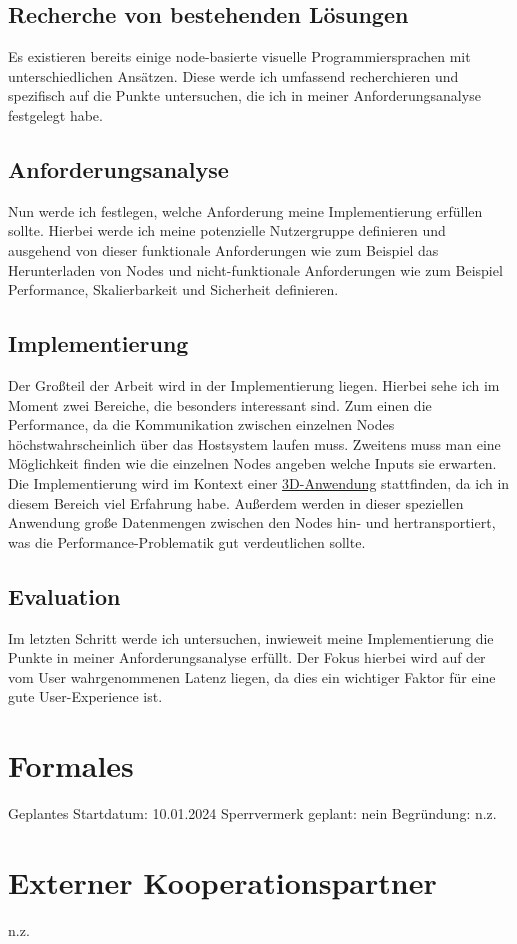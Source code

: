 \documentclass[ngerman]{article}
\begin{document}
\subsection{Recherche von bestehenden Lösungen}
Es existieren bereits einige node-basierte visuelle Programmiersprachen mit unterschiedlichen Ansätzen. Diese werde ich umfassend recherchieren und spezifisch auf die Punkte untersuchen, die ich in meiner Anforderungsanalyse festgelegt habe.

\subsection{Anforderungsanalyse}
Nun werde ich festlegen, welche Anforderung meine Implementierung erfüllen sollte. Hierbei werde ich meine potenzielle Nutzergruppe definieren und ausgehend von dieser funktionale Anforderungen wie zum Beispiel das Herunterladen von Nodes und nicht-funktionale Anforderungen wie zum Beispiel Performance, Skalierbarkeit und Sicherheit definieren.

\subsection{Implementierung}
Der Großteil der Arbeit wird in der Implementierung liegen. Hierbei sehe ich im Moment zwei Bereiche, die besonders interessant sind. Zum einen die Performance, da die Kommunikation zwischen einzelnen Nodes höchstwahrscheinlich über das Hostsystem laufen muss. Zweitens muss man eine Möglichkeit finden wie die einzelnen Nodes angeben welche Inputs sie erwarten. 
\linebreak
\linebreak
Die Implementierung wird im Kontext einer \href{https://plant.max-richter.dev}{3D-Anwendung} stattfinden, da ich in diesem Bereich viel Erfahrung habe. Außerdem werden in dieser speziellen Anwendung große Datenmengen zwischen den Nodes hin- und hertransportiert, was die Performance-Problematik gut verdeutlichen sollte.

\subsection{Evaluation}
Im letzten Schritt werde ich untersuchen, inwieweit meine Implementierung die Punkte in meiner Anforderungsanalyse erfüllt. Der Fokus hierbei wird auf der vom User wahrgenommenen Latenz liegen, da dies ein wichtiger Faktor für eine gute User-Experience ist. \cite{6876022}

\section{Formales}
Geplantes Startdatum: 10.01.2024
\linebreak
Sperrvermerk geplant: nein
\linebreak
Begründung: n.z.

\section{Externer Kooperationspartner}
n.z.

\pagebreak

\printbibliography
\end{document}
